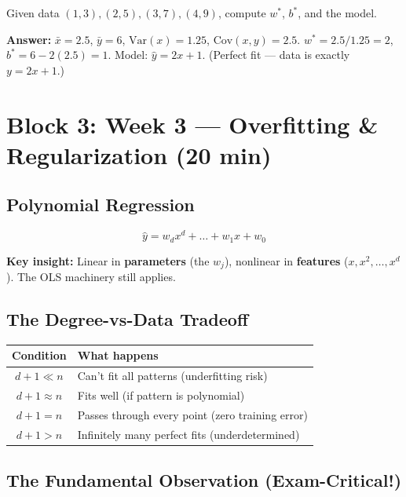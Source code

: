 \documentclass[11pt,a4paper]{article}
\begin{document}
\begin{tcolorbox}[colback=blue!5,colframe=blue!50,title=Mini-Exercise (3 min)]
Given data $(1,3), (2,5), (3,7), (4,9)$, compute $w^*$, $b^*$, and the model.
\end{tcolorbox}
\noindent\textbf{Answer:} $\bar{x}=2.5$, $\bar{y}=6$, $\text{Var}(x)=1.25$, $\text{Cov}(x,y)=2.5$. $w^* = 2.5/1.25 = 2$, $b^* = 6 - 2(2.5) = 1$. Model: $\hat{y} = 2x + 1$. (Perfect fit --- data is exactly $y = 2x+1$.)

\section{Block 3: Week 3 --- Overfitting \& Regularization (20 min)}

\subsection{Polynomial Regression}

$$\hat{y} = w_d x^d + \ldots + w_1 x + w_0$$

\textbf{Key insight:} Linear in \textbf{parameters} (the $w_j$), nonlinear in \textbf{features} ($x, x^2, \ldots, x^d$). The OLS machinery still applies.

\subsection{The Degree-vs-Data Tradeoff}

\begin{center}
\begin{tabular}{|c|l|}
\hline
\textbf{Condition} & \textbf{What happens} \\
\hline
$d+1 \ll n$ & Can't fit all patterns (underfitting risk) \\
$d+1 \approx n$ & Fits well (if pattern is polynomial) \\
$d+1 = n$ & Passes through every point (zero training error) \\
$d+1 > n$ & Infinitely many perfect fits (underdetermined) \\
\hline
\end{tabular}
\end{center}

\subsection{The Fundamental Observation (Exam-Critical!)}
\end{document}
